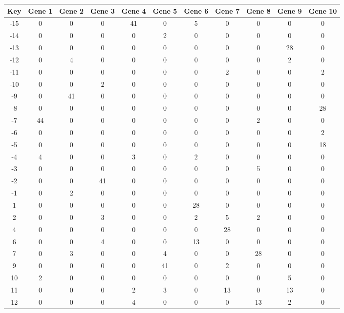 \begin{tabular}{|c|c|c|c|c|c|c|c|c|c|c|}
\hline
Key & Gene 1 & Gene 2 & Gene 3 & Gene 4 & Gene 5 & Gene 6 & Gene 7 & Gene 8 & Gene 9 & Gene 10 \\
\hline
-15 & 0 & 0 & 0 & 41 & 0 & 5 & 0 & 0 & 0 & 0 \\
-14 & 0 & 0 & 0 & 0 & 2 & 0 & 0 & 0 & 0 & 0 \\
-13 & 0 & 0 & 0 & 0 & 0 & 0 & 0 & 0 & 28 & 0 \\
-12 & 0 & 4 & 0 & 0 & 0 & 0 & 0 & 0 & 2 & 0 \\
-11 & 0 & 0 & 0 & 0 & 0 & 0 & 2 & 0 & 0 & 2 \\
-10 & 0 & 0 & 2 & 0 & 0 & 0 & 0 & 0 & 0 & 0 \\
-9 & 0 & 41 & 0 & 0 & 0 & 0 & 0 & 0 & 0 & 0 \\
-8 & 0 & 0 & 0 & 0 & 0 & 0 & 0 & 0 & 0 & 28 \\
-7 & 44 & 0 & 0 & 0 & 0 & 0 & 0 & 2 & 0 & 0 \\
-6 & 0 & 0 & 0 & 0 & 0 & 0 & 0 & 0 & 0 & 2 \\
-5 & 0 & 0 & 0 & 0 & 0 & 0 & 0 & 0 & 0 & 18 \\
-4 & 4 & 0 & 0 & 3 & 0 & 2 & 0 & 0 & 0 & 0 \\
-3 & 0 & 0 & 0 & 0 & 0 & 0 & 0 & 5 & 0 & 0 \\
-2 & 0 & 0 & 41 & 0 & 0 & 0 & 0 & 0 & 0 & 0 \\
-1 & 0 & 2 & 0 & 0 & 0 & 0 & 0 & 0 & 0 & 0 \\
1 & 0 & 0 & 0 & 0 & 0 & 28 & 0 & 0 & 0 & 0 \\
2 & 0 & 0 & 3 & 0 & 0 & 2 & 5 & 2 & 0 & 0 \\
4 & 0 & 0 & 0 & 0 & 0 & 0 & 28 & 0 & 0 & 0 \\
6 & 0 & 0 & 4 & 0 & 0 & 13 & 0 & 0 & 0 & 0 \\
7 & 0 & 3 & 0 & 0 & 4 & 0 & 0 & 28 & 0 & 0 \\
9 & 0 & 0 & 0 & 0 & 41 & 0 & 2 & 0 & 0 & 0 \\
10 & 2 & 0 & 0 & 0 & 0 & 0 & 0 & 0 & 5 & 0 \\
11 & 0 & 0 & 0 & 2 & 3 & 0 & 13 & 0 & 13 & 0 \\
12 & 0 & 0 & 0 & 4 & 0 & 0 & 0 & 13 & 2 & 0 \\
\hline
\end{tabular}